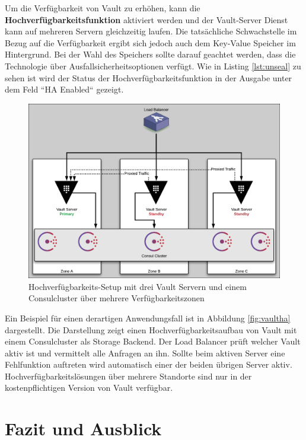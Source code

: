 \documentclass[
book,
a4paper,   
titlepage,  
halfparskip,
12pt        
]{scrartcl}
\begin{document}
\begin{onehalfspacing}
Um die Verfügbarkeit von Vault zu erhöhen, kann die \textbf{Hochverfügbarkeitsfunktion} aktiviert werden und der Vault-Server Dienst kann auf mehreren Servern gleichzeitig laufen. Die tatsächliche Schwachstelle im Bezug auf die Verfügbarkeit ergibt sich jedoch auch dem Key-Value Speicher im Hintergrund. Bei der Wahl des Speichers sollte darauf geachtet werden, dass die Technologie über Ausfallsicherheitsoptionen verfügt. Wie in Listing \vref{lst:unseal} zu sehen ist wird der Status der Hochverfügbarkeitsfunktion in der Ausgabe unter dem Feld ``HA Enabled`` gezeigt.\\

\begin{figure}[h]
	\centering
	\includegraphics[width=1\linewidth]{vaultha.png}
	\caption[Vault High Availability]{Hochverfügbarkeits-Setup mit drei Vault Servern und einem Consulcluster über mehrere Verfügbarkeitszonen\cite{vaultha}}
	\label{fig:vaultha}
\end{figure}

Ein Beispiel für einen derartigen Anwendungsfall ist in Abbildung \vref{fig:vaultha} dargestellt. Die Darstellung zeigt einen Hochverfügbarkeitsaufbau von Vault mit einem Consulcluster als Storage Backend. Der Load Balancer prüft welcher Vault aktiv ist und vermittelt alle Anfragen an ihn. Sollte beim aktiven Server eine Fehlfunktion auftreten wird automatisch einer der beiden übrigen Server aktiv. Hochverfügbarkeitslösungen über mehrere Standorte sind nur in der kostenpflichtigen Version von Vault verfügbar. 
 
\newpage
\section{Fazit und Ausblick}
\label{sec:ausblick}


\end{onehalfspacing}
\end{document}
